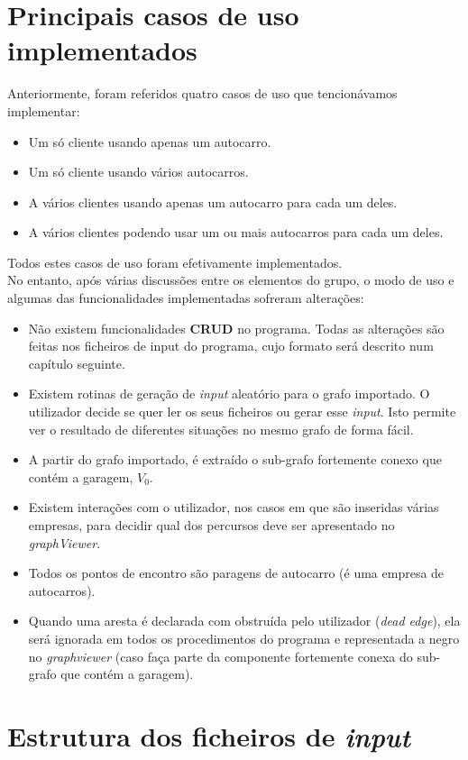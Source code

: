 \documentclass{report}
\begin{document}
\chapter{Principais casos de uso implementados}
  Anteriormente, foram referidos quatro casos de uso que tencionávamos implementar:
  \begin{itemize}
  \item Um só cliente usando apenas um autocarro.
  \item Um só cliente usando vários autocarros.
  \item A vários clientes usando apenas um autocarro para cada um deles.
  \item A vários clientes podendo usar um ou mais autocarros para cada um deles.
  \end{itemize}
  Todos estes casos de uso foram efetivamente implementados.\\
  No entanto, após várias discussões entre os elementos do grupo, o modo de uso
  e algumas das funcionalidades implementadas sofreram alterações:
  \begin{itemize}
  \item Não existem funcionalidades \textbf{CRUD} no programa. Todas as alterações
    são feitas nos ficheiros de input do programa, cujo formato será descrito num
    capítulo seguinte.
  \item Existem rotinas de geração de \textit{input} aleatório para o grafo importado.
    O utilizador decide se quer ler os seus ficheiros ou gerar esse \textit{input}.
    Isto permite ver o resultado de diferentes situações no mesmo grafo de forma fácil.
  \item A partir do grafo importado, é extraído o sub-grafo fortemente conexo que contém
    a garagem, $V_0$.
  \item Existem interações com o utilizador, nos casos em que são inseridas várias
    empresas, para decidir qual dos percursos deve ser apresentado no \textit{graphViewer}.
  \item Todos os pontos de encontro são paragens de autocarro (é uma empresa de autocarros).
  \item Quando uma aresta é declarada com obstruída pelo utilizador (\textit{dead edge}),
    ela será ignorada em todos os procedimentos do programa e representada a negro no
    \textit{graphviewer} (caso faça parte da componente fortemente conexa do sub-grafo
    que contém a garagem).
  \end{itemize}

\chapter{Estrutura dos ficheiros de \textit{input}}
\end{document}
